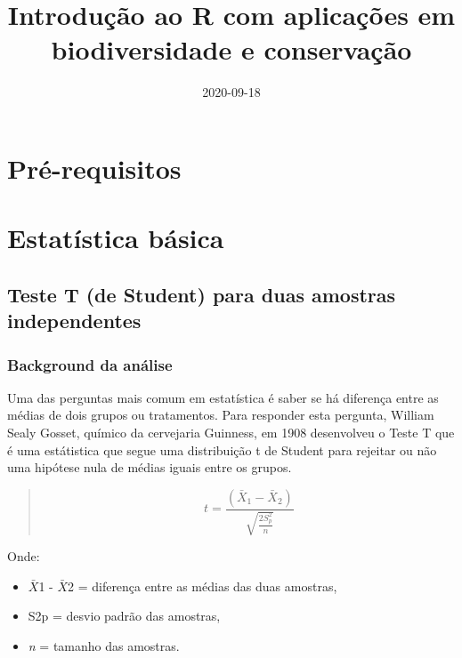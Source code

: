 \documentclass[
]{book}
\title{Introdução ao R com aplicações em biodiversidade e conservação}
\author{}
\date{\vspace{-2.5em}2020-09-18}
\begin{document}
\maketitle

{
\setcounter{tocdepth}{1}
\tableofcontents
}
\hypertarget{pruxe9-requisitos}{%
\chapter{Pré-requisitos}\label{pruxe9-requisitos}}

\hypertarget{estatuxedstica-buxe1sica}{%
\chapter{Estatística básica}\label{estatuxedstica-buxe1sica}}

\hypertarget{teste-t-de-student-para-duas-amostras-independentes}{%
\section{Teste T (de Student) para duas amostras independentes}\label{teste-t-de-student-para-duas-amostras-independentes}}

\hypertarget{background-da-anuxe1lise}{%
\subsection{Background da análise}\label{background-da-anuxe1lise}}

Uma das perguntas mais comum em estatística é saber se há diferença entre as médias de dois grupos ou tratamentos. Para responder esta pergunta, William Sealy Gosset, químico da cervejaria Guinness, em 1908 desenvolveu o Teste T que é uma estátistica que segue uma distribuição t de Student para rejeitar ou não uma hipótese nula de médias iguais entre os grupos.

\begin{quote}
\[ t = \frac{(\bar{X}_1 - \bar{X}_2)}{\sqrt{\frac{2S^2_p}{n}}}\]
\end{quote}

Onde:

\begin{itemize}
\item
  \(\bar{X}\)1 - \(\bar{X}\)2 = diferença entre as médias das duas amostras,
\item
  S2p = desvio padrão das amostras,
\item
  \emph{n} = tamanho das amostras.
\end{itemize}
\end{document}
